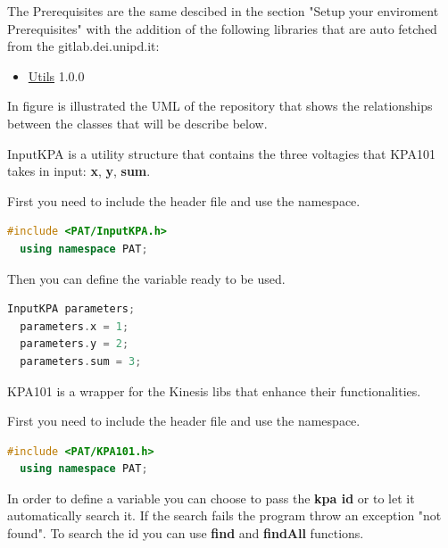
The Prerequisites are the same descibed in the section "Setup your enviroment Prerequisites"  with the addition of the following libraries that are auto fetched from the gitlab.dei.unipd.it:

\begin{itemize}
  \tightlist
  \item
        \href{https://gitlab.dei.unipd.it/PAT/Utils.git}{Utils} 1.0.0
\end{itemize}

In figure  is illustrated the UML of the repository that shows the relationships between the classes that will be describe below.



InputKPA is a utility structure that contains the three voltagies that
KPA101 takes in input: \textbf{x}, \textbf{y}, \textbf{sum}.

First you need to include the header file and use the namespace.

\begin{lstlisting}[language=c++, gobble=2]
  #include <PAT/InputKPA.h>
  using namespace PAT;  
\end{lstlisting}

Then you can define the variable ready to be used.

\begin{lstlisting}[language=c++, gobble=2]
  InputKPA parameters;
  parameters.x = 1;
  parameters.y = 2;
  parameters.sum = 3;
\end{lstlisting}


KPA101 is a wrapper for the Kinesis libs that enhance their
functionalities.

First you need to include the header file and use the namespace.

\begin{lstlisting}[language=c++, gobble=2]
  #include <PAT/KPA101.h>
  using namespace PAT;
\end{lstlisting}

In order to define a variable you can choose to pass the \textbf{kpa id}
or to let it automatically search it. If the search fails the program
throw an exception "not found". To search the id you can use
\textbf{find} and \textbf{findAll} functions.

